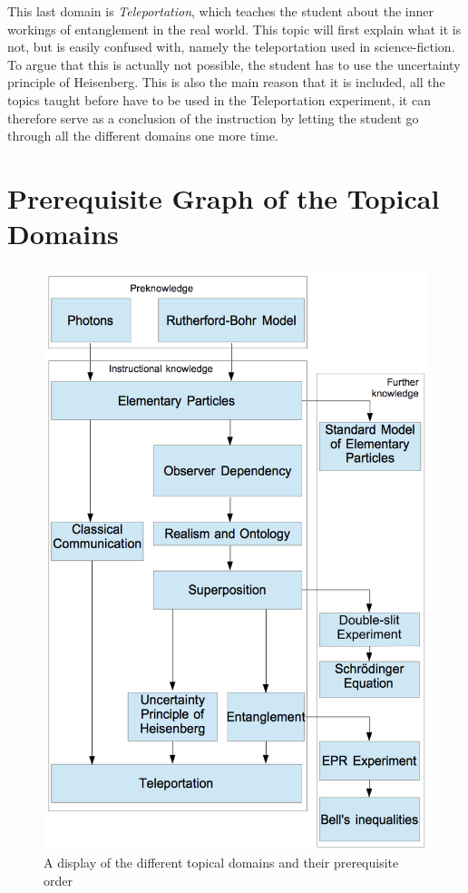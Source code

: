 \documentclass[11pt,twoside]{report} %
\begin{document}
This last domain is \emph{Teleportation}, which teaches the student about the inner workings of entanglement in the real world. This topic will first explain what it is not, but is easily confused with, namely the teleportation used in science-fiction. To argue that this is actually not possible, the student has to use the uncertainty principle of Heisenberg. This is also the main reason that it is included, all the topics taught before have to be used in the Teleportation experiment, it can therefore  serve as a conclusion of the instruction by letting the student go through all the different domains one more time.

\newpage

\chapter{Prerequisite Graph of the Topical Domains}

\begin{figure}[h!]
\centering
\includegraphics[height=0.75\textheight]{knowledgediagram}
\caption{A display of the different topical domains and their prerequisite order}
\label{fig:knowledgediagram}
\end{figure}
\end{document}

